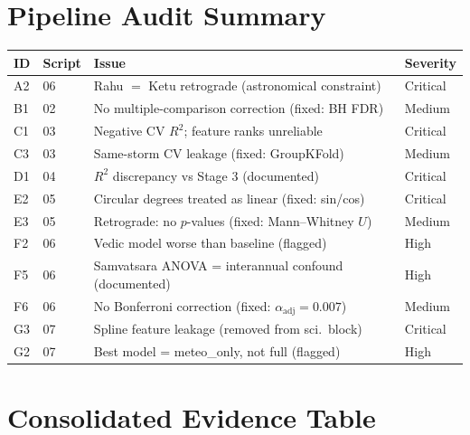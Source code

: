 \documentclass[12pt,a4paper]{article}
\begin{document}
    \section{Pipeline Audit Summary}
    \label{app:audit}

    \begin{center}
    \small
    \begin{tabular}{llll}
    \toprule
    \textbf{ID} & \textbf{Script} & \textbf{Issue} & \textbf{Severity} \\
    \midrule
    A2 & 06 & Rahu $=$ Ketu retrograde (astronomical constraint) & Critical \\
    B1 & 02 & No multiple-comparison correction (fixed: BH FDR) & Medium \\
    C1 & 03 & Negative CV $R^2$; feature ranks unreliable & Critical \\
    C3 & 03 & Same-storm CV leakage (fixed: GroupKFold) & Medium \\
    D1 & 04 & $R^2$ discrepancy vs Stage 3 (documented) & Critical \\
    E2 & 05 & Circular degrees treated as linear (fixed: sin/cos) & Critical \\
    E3 & 05 & Retrograde: no $p$-values (fixed: Mann--Whitney $U$) & Medium \\
    F2 & 06 & Vedic model worse than baseline (flagged) & High \\
    F5 & 06 & Samvatsara ANOVA = interannual confound (documented) & High \\
    F6 & 06 & No Bonferroni correction (fixed: $\alpha_{\text{adj}} = 0.007$) & Medium \\
    G3 & 07 & Spline feature leakage (removed from sci.\ block) & Critical \\
    G2 & 07 & Best model = meteo\_only, not full (flagged) & High \\
    \bottomrule
    \end{tabular}
    \end{center}

    \section{Consolidated Evidence Table}
    \label{app:evidence}
\end{document}
